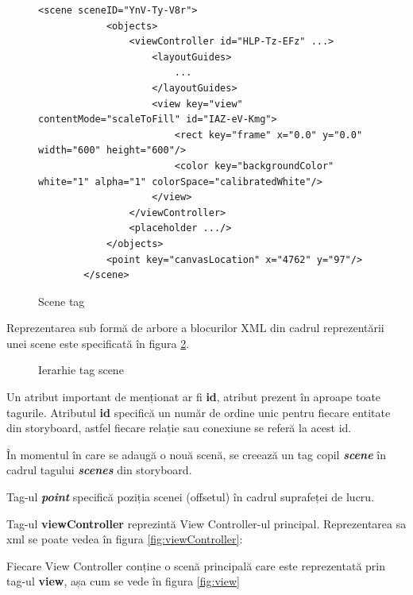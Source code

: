 \begin{figure}[!htbp]
\lstset{language=XML}
\begin{lstlisting}
<scene sceneID="YnV-Ty-V8r">
            <objects>
                <viewController id="HLP-Tz-EFz" ...>
                    <layoutGuides>
                        ...
                    </layoutGuides>
                    <view key="view" contentMode="scaleToFill" id="IAZ-eV-Kmg">
                        <rect key="frame" x="0.0" y="0.0" width="600" height="600"/>
                        <color key="backgroundColor" white="1" alpha="1" colorSpace="calibratedWhite"/>
                    </view>
                </viewController>
                <placeholder .../>
            </objects>
            <point key="canvasLocation" x="4762" y="97"/>
        </scene>
\end{lstlisting}
\caption{Scene tag}\label{fig:scene}
\end{figure}

Reprezentarea sub formă de arbore a blocurilor XML din cadrul reprezentării unei scene este specificată în figura \ref{fig:sceneIerarhie}.

\begin{figure}[!htbp]
\caption{Ierarhie tag scene}\label{fig:sceneIerarhie}
\end{figure}

Un atribut important de menționat ar fi \textbf{id}, atribut prezent în aproape toate tagurile. Atributul \textbf{id} specifică un număr de ordine unic pentru fiecare entitate din storyboard, astfel fiecare relație sau conexiune se referă la acest id.

În momentul în care se adaugă o nouă scenă, se creează un tag copil \textbf{\textit{scene}} în cadrul tagului \textbf{\textit{scenes}} din storyboard. 

Tag-ul \textbf{\textit{point}} specifică poziția scenei (offsetul) în cadrul suprafeței de lucru.

Tag-ul \textbf{viewController} reprezintă View Controller-ul principal. Reprezentarea sa xml se poate vedea în figura \ref{fig:viewController}:


Fiecare View Controller conține o scenă principală care este reprezentată prin tag-ul \textbf{view}, așa cum se vede în figura \ref{fig:view}


